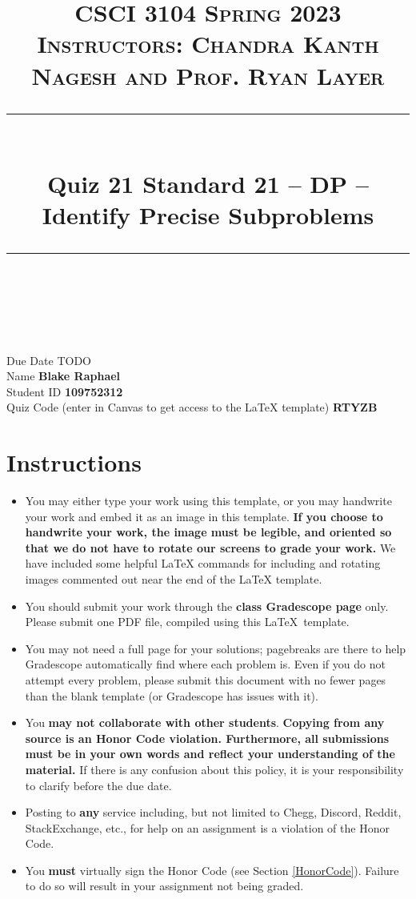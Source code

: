 \documentclass[11pt]{article}
\title{
\normalfont \normalsize 
\textsc{CSCI 3104 Spring 2023 \\ 
Instructors: Chandra Kanth Nagesh and Prof. Ryan Layer} \\
[10pt] 
\rule{\linewidth}{0.5pt} \\[6pt] 
\huge Quiz 21 Standard 21 --  DP -- Identify Precise Subproblems \\
\rule{\linewidth}{2pt}  \\[10pt]
}
\date{}
\theoremstyle{definition}
\theoremstyle{definition}
\theoremstyle{definition}
\begin{document}

\maketitle


\noindent
Due Date \dotfill TODO \\
Name \dotfill \textbf{Blake Raphael} \\
Student ID \dotfill \textbf{109752312} \\
Quiz Code (enter in Canvas to get access to the LaTeX template) \dotfill \textbf{RTYZB}


\tableofcontents

\section*{Instructions}
 \begin{itemize}
	\item You may either type your work using this template, or you may handwrite your work and embed it as an image in this template. \textbf{If you choose to handwrite your work, the image must be legible, and oriented so that we do not have to rotate our screens to grade your work.} We have included some helpful LaTeX commands for including and rotating images commented out near the end of the LaTeX template.
	\item You should submit your work through the \textbf{class Gradescope page} only. Please submit one PDF file, compiled using this \LaTeX \ template.
	\item You may not need a full page for your solutions; pagebreaks are there to help Gradescope automatically find where each problem is. Even if you do not attempt every problem, please submit this document with no fewer pages than the blank template (or Gradescope has issues with it).

	\item You \textbf{may not collaborate with other students}. \textbf{Copying from any source is an Honor Code violation. Furthermore, all submissions must be in your own words and reflect your understanding of the material.} If there is any confusion about this policy, it is your responsibility to clarify before the due date. 

	\item Posting to \textbf{any} service including, but not limited to Chegg, Discord, Reddit, StackExchange, etc., for help on an assignment is a violation of the Honor Code.

	\item You \textbf{must} virtually sign the Honor Code (see Section \ref{HonorCode}). Failure to do so will result in your assignment not being graded.
\end{itemize}
\end{document}
